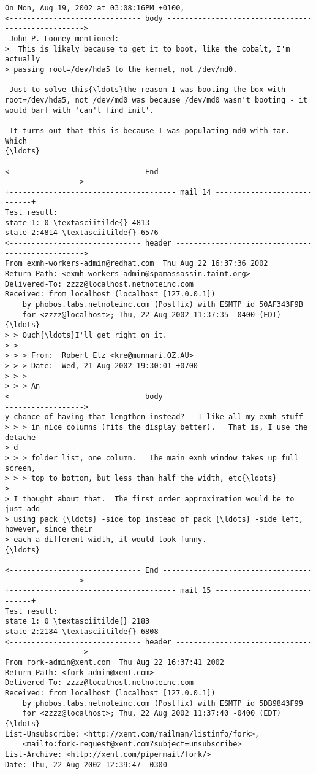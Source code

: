\documentclass[11pt]{article}
\begin{document}
\begin{Verbatim}[commandchars=\\\{\}]
On Mon, Aug 19, 2002 at 03:08:16PM +0100,
<------------------------------ body --------------------------------------------------->
 John P. Looney mentioned:
>  This is likely because to get it to boot, like the cobalt, I'm actually
> passing root=/dev/hda5 to the kernel, not /dev/md0. 

 Just to solve this{\ldots}the reason I was booting the box with
root=/dev/hda5, not /dev/md0 was because /dev/md0 wasn't booting - it
would barf with 'can't find init'.

 It turns out that this is because I was populating md0 with tar. Which
{\ldots}

<------------------------------ End --------------------------------------------------->
+-------------------------------------- mail 14 ----------------------------+
Test result:
state 1: 0 \textasciitilde{} 4813
state 2:4814 \textasciitilde{} 6576
<------------------------------ header ------------------------------------------------->
From exmh-workers-admin@redhat.com  Thu Aug 22 16:37:36 2002
Return-Path: <exmh-workers-admin@spamassassin.taint.org>
Delivered-To: zzzz@localhost.netnoteinc.com
Received: from localhost (localhost [127.0.0.1])
	by phobos.labs.netnoteinc.com (Postfix) with ESMTP id 50AF343F9B
	for <zzzz@localhost>; Thu, 22 Aug 2002 11:37:35 -0400 (EDT)
{\ldots}
> > Ouch{\ldots}I'll get right on it.
> > 
> > > From:  Robert Elz <kre@munnari.OZ.AU>
> > > Date:  Wed, 21 Aug 2002 19:30:01 +0700
> > >
> > > An
<------------------------------ body --------------------------------------------------->
y chance of having that lengthen instead?   I like all my exmh stuff
> > > in nice columns (fits the display better).   That is, I use the detache
> d
> > > folder list, one column.   The main exmh window takes up full screen,
> > > top to bottom, but less than half the width, etc{\ldots}
> 
> I thought about that.  The first order approximation would be to just add 
> using pack {\ldots} -side top instead of pack {\ldots} -side left, however, since their 
> each a different width, it would look funny.
{\ldots}

<------------------------------ End --------------------------------------------------->
+-------------------------------------- mail 15 ----------------------------+
Test result:
state 1: 0 \textasciitilde{} 2183
state 2:2184 \textasciitilde{} 6808
<------------------------------ header ------------------------------------------------->
From fork-admin@xent.com  Thu Aug 22 16:37:41 2002
Return-Path: <fork-admin@xent.com>
Delivered-To: zzzz@localhost.netnoteinc.com
Received: from localhost (localhost [127.0.0.1])
	by phobos.labs.netnoteinc.com (Postfix) with ESMTP id 5DB9843F99
	for <zzzz@localhost>; Thu, 22 Aug 2002 11:37:40 -0400 (EDT)
{\ldots}
List-Unsubscribe: <http://xent.com/mailman/listinfo/fork>,
    <mailto:fork-request@xent.com?subject=unsubscribe>
List-Archive: <http://xent.com/pipermail/fork/>
Date: Thu, 22 Aug 2002 12:39:47 -0300


\end{Verbatim}
\end{document}
